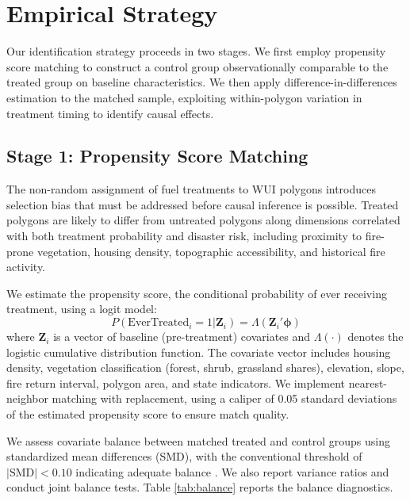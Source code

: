 \documentclass[12pt, letterpaper]{article}
\begin{document}
\section{Empirical Strategy}

Our identification strategy proceeds in two stages. We first employ propensity score matching to construct a control group observationally comparable to the treated group on baseline characteristics. We then apply difference-in-differences estimation to the matched sample, exploiting within-polygon variation in treatment timing to identify causal effects.

\subsection{Stage 1: Propensity Score Matching}

The non-random assignment of fuel treatments to WUI polygons introduces selection bias that must be addressed before causal inference is possible. Treated polygons are likely to differ from untreated polygons along dimensions correlated with both treatment probability and disaster risk, including proximity to fire-prone vegetation, housing density, topographic accessibility, and historical fire activity.

We estimate the propensity score, the conditional probability of ever receiving treatment, using a logit model:
\begin{equation}
    P(\text{EverTreated}_i = 1 | \mathbf{Z}_i) = \Lambda(\mathbf{Z}_i' \boldsymbol{\phi})
    \label{eq:psm}
\end{equation}
where $\mathbf{Z}_i$ is a vector of baseline (pre-treatment) covariates and $\Lambda(\cdot)$ denotes the logistic cumulative distribution function. The covariate vector includes housing density, vegetation classification (forest, shrub, grassland shares), elevation, slope, fire return interval, polygon area, and state indicators. We implement nearest-neighbor matching with replacement, using a caliper of 0.05 standard deviations of the estimated propensity score to ensure match quality.

We assess covariate balance between matched treated and control groups using standardized mean differences (SMD), with the conventional threshold of $|\text{SMD}| < 0.10$ indicating adequate balance \citep{rosenbaum1983}. We also report variance ratios and conduct joint balance tests. Table \ref{tab:balance} reports the balance diagnostics.
\end{document}
